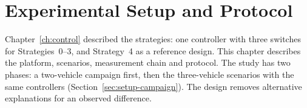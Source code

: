 %
%
%

\chapter{Experimental Setup and Protocol}
\label{ch:setup}

Chapter~\ref{ch:control} described the strategies: one controller with three switches for
Strategies~0--3, and Strategy~4 as a reference design. This chapter
describes the platform, scenarios, measurement chain and protocol. The study has two phases: a
two-vehicle campaign first, then the three-vehicle scenarios with the same controllers
(Section~\ref{sec:setup-campaign}).
The design removes alternative
explanations for an observed difference.


